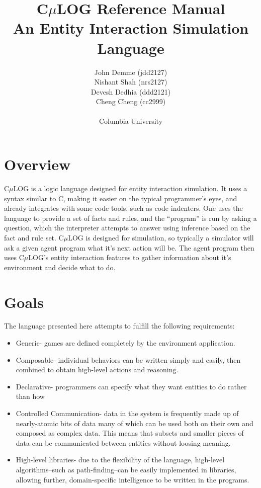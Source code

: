 \documentclass[onecolumn,titlepage]{article}
\begin{document}
\title{C$\mu$LOG Reference Manual\\\small{An Entity Interaction Simulation Language}}
\author{John Demme (jdd2127)\\Nishant Shah (nrs2127)\\Devesh Dedhia (ddd2121)\\Cheng Cheng (cc2999)
\\ \\Columbia University}

\maketitle

\section{Overview}
C$\mu$LOG is a logic language designed for entity interaction simulation.  It uses a syntax similar to C, making it easier on the typical programmer's eyes, and already integrates with some code tools, such as code indenters.  One uses the language to provide a set of facts and rules, and the ``program'' is run by asking a question, which the interpreter attempts to answer using inference based on the fact and rule set.  C$\mu$LOG is designed for simulation, so typically a simulator will ask a given agent program what it's next action will be.  The agent program then uses C$\mu$LOG's entity interaction features to gather information about it's environment and decide what to do.

\section{Goals}
The language presented here attempts to fulfill the following requirements:
\begin{itemize}
\item Generic- games are defined completely by the environment application.

\item Composable- individual behaviors can be written simply and easily, then combined
  to obtain high-level actions and reasoning.

\item Declarative- programmers can specify what they want entities to do rather than how

\item Controlled Communication- data in the system is frequently made up of nearly-atomic bits of data
  many of which can be used both on their own and composed as complex data.  This means that subsets
  and smaller pieces of data can be communicated between entities without loosing meaning.

\item High-level libraries- due to the flexibility of the language, high-level
  algorithms--such as path-finding--can be easily implemented in libraries, allowing
  further, domain-specific intelligence to be written in the programs.
\end{itemize}
\end{document}
